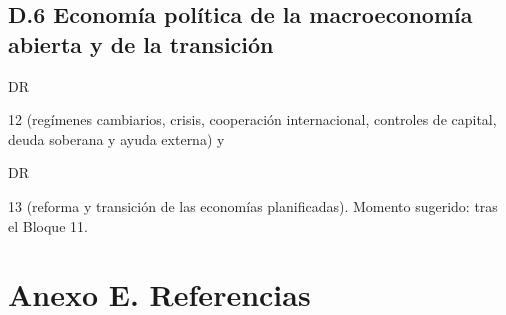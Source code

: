 \documentclass[11pt,a4paper]{article}
\newcommand{\etiqueta}[2]{%
  {\setlength{\fboxsep}{1.4pt}\colorbox{#1}{\sffamily\bfseries\color{white}\strut#2}}}
\newcommand{\DR}[1]{\etiqueta{colorDR}{DR}\nobreak\hspace{0.25em}\textcolor{colorDR}{#1}}
\begin{document}
\subsection*{D.6 Economía política de la macroeconomía abierta y de la transición}
\DR{12} (regímenes cambiarios, crisis, cooperación internacional, controles de
capital, deuda soberana y ayuda externa) y \DR{13} (reforma y transición de
las economías planificadas). Momento sugerido: tras el Bloque 11.

\section*{Anexo E. Referencias}
\end{document}
